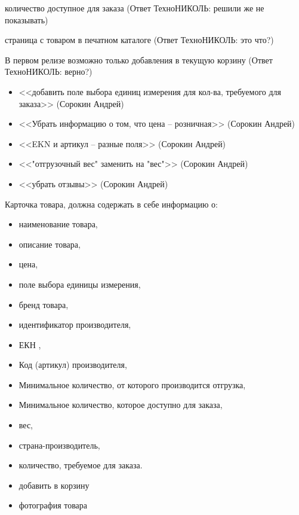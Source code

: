 {\begin{hybris}
количество доступное для заказа (Ответ ТехноНИКОЛЬ: решили же не показывать)

страница с товаром в печатном каталоге (Ответ ТехноНИКОЛЬ: это что?)

В первом релизе возможно только добавления в текущую корзину (Ответ ТехноНИКОЛЬ: верно?)
\end{hybris}

\begin{tn}
\begin{itemize}
\item <<добавить поле выбора единиц измерения для кол-ва, требуемого для заказа>> (Сорокин Андрей)
\item <<Убрать информацию о том, что цена -- розничная>> (Сорокин Андрей)
\item <<EKN и артикул -- разные поля>> (Сорокин Андрей)
\item <<"отгрузочный вес" заменить на "вес">> (Сорокин Андрей)
\item <<убрать отзывы>> (Сорокин Андрей)
\end{itemize}
\end{tn}


\begin{itogo}
Карточка товара, должна содержать в себе информацию о: 
\begin{itemize}
\item наименование товара,
\item описание товара,
\item цена,
\item поле выбора единицы измерения,
\item бренд товара,
\item идентификатор производителя,
\item ЕКН ,
\item Код (артикул) производителя,
\item Минимальное количество, от которого производится отгрузка,
\item Минимальное количество, которое доступно для заказа,
\item вес,
\item страна-производитель,
\item количество, требуемое для заказа.
\item добавить в корзину
\item фотография товара
\end{itemize}
\end{itogo}




}


